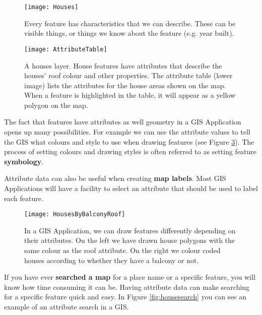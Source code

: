 \begin{figure}[ht]
   \begin{center}
   \caption{Every feature has characteristics that we can describe. These can
be visible things, or things we know about the feature (e.g. year built).}
\label{fig:houses}\smallskip
   \texttt{[image: Houses]}
\end{center}
\end{figure}

\begin{figure}[h]
   \begin{center}
   \caption{A houses layer. House features have attributes that describe the
houses' roof colour and other properties. The attribute table (lower image)
lists the attributes for the house areas shown on the map. When a feature is
highlighted  in the table, it will appear as a yellow polygon on the map.}
\label{fig:attrtable}\smallskip
   \texttt{[image: AttributeTable]}
\end{center}
\end{figure}

The fact that features have attributes as well geometry in a GIS Application
opens up many possibilities. For example we can use the attribute values to
tell the GIS what colours and style to use when drawing features (see Figure
\ref{fig:houseroofbalc}). The process of setting colours and drawing styles is
often referred to as setting feature \textbf{symbology}. 

Attribute data can also be useful when creating \textbf{map labels}. Most GIS
Applications will have a facility to select an attribute that should be used
to label each feature. 

\begin{figure}[ht]
   \begin{center}
   \caption{In a GIS Application, we can draw features differently depending
on their attributes. On the left we have drawn house polygons with the same
colour as the roof attribute. On the right we colour coded houses according
to whether they have a balcony or not.}
\label{fig:houseroofbalc}\smallskip
   \texttt{[image: HousesByBalconyRoof]}
\end{center}
\end{figure}

If you have ever \textbf{searched a map} for a place name or a specific
feature, you
will know how time consuming it can be. Having attribute data can make
searching for a specific feature quick and easy. In Figure
\ref{fig:housesearch} you can see an example of an attribute search in a GIS. 

